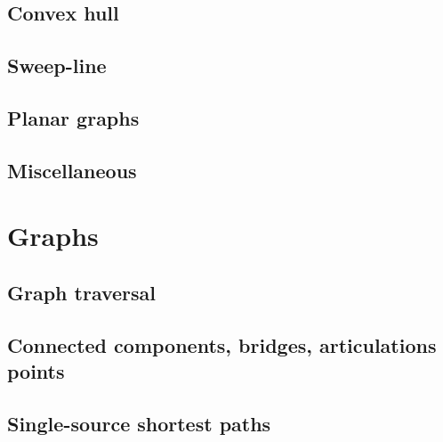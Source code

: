 \documentclass[11pt,a4paper,oneside]{book}
\let\Oldpart\part
\newcommand\parttitle{}
\renewcommand\part[1]{\Oldpart{#1}\thispagestyle{empty}\renewcommand{\parttitle}{#1}}
\begin{document}
\chapter{Convex hull}


\chapter{Sweep-line}

\chapter{Planar graphs}


\chapter{Miscellaneous}






\part{Graphs}
\chapter{Graph traversal}


\chapter{Connected components, bridges, articulations points}






\chapter{Single-source shortest paths}





\end{document}
